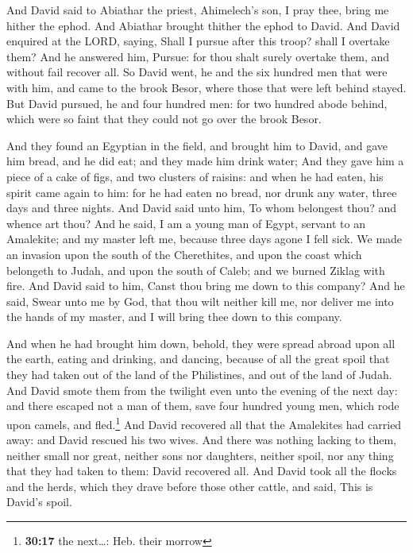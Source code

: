  And David said to Abiathar the priest, Ahimelech's son, I
pray thee, bring me hither the ephod. And Abiathar brought thither the
ephod to David.  And David enquired at the LORD, saying,
Shall I pursue after this troop? shall I overtake them? And he answered
him, Pursue: for thou shalt surely overtake them, and without fail
recover all.  So David went, he and the six hundred men
that were with him, and came to the brook Besor, where those that were
left behind stayed.  But David pursued, he and four
hundred men: for two hundred abode behind, which were so faint that they
could not go over the brook Besor.

 And they found an Egyptian in the field, and brought him
to David, and gave him bread, and he did eat; and they made him drink
water;  And they gave him a piece of a cake of figs, and
two clusters of raisins: and when he had eaten, his spirit came again to
him: for he had eaten no bread, nor drunk any water, three days and
three nights.  And David said unto him, To whom belongest
thou? and whence art thou? And he said, I am a young man of Egypt,
servant to an Amalekite; and my master left me, because three days agone
I fell sick.  We made an invasion upon the south of the
Cherethites, and upon the coast which belongeth to Judah, and upon the
south of Caleb; and we burned Ziklag with fire.  And
David said to him, Canst thou bring me down to this company? And he
said, Swear unto me by God, that thou wilt neither kill me, nor deliver
me into the hands of my master, and I will bring thee down to this
company.

 And when he had brought him down, behold, they were
spread abroad upon all the earth, eating and drinking, and dancing,
because of all the great spoil that they had taken out of the land of
the Philistines, and out of the land of Judah.  And David
smote them from the twilight even unto the evening of the next day: and
there escaped not a man of them, save four hundred young men, which rode
upon camels, and fled.\footnote{\textbf{30:17} the next\ldots: Heb.
  their morrow}  And David recovered all that the
Amalekites had carried away: and David rescued his two wives.
 And there was nothing lacking to them, neither small nor
great, neither sons nor daughters, neither spoil, nor any thing that
they had taken to them: David recovered all.  And David
took all the flocks and the herds, which they drave before those other
cattle, and said, This is David's spoil.

